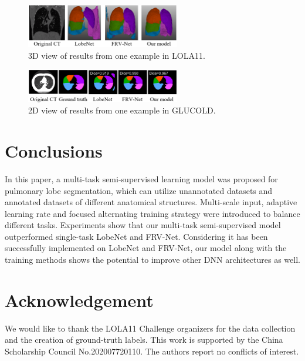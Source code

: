 \begin{figure}[tb]
    \centering
    \includegraphics[width=0.6\textwidth]{3d_compare.png}
    \caption{3D view of results from one example in LOLA11.}
    \label{fig:chap2_3d}
\end{figure}

\begin{figure}[tb]
    \centering
    \includegraphics[width=0.6\textwidth]{2d_compare.png}
    \caption{2D view of results from one example in GLUCOLD.}
    \label{fig:chap2_2d}
\end{figure}



\section{Conclusions}
In this paper, a multi-task semi-supervised learning model was proposed for pulmonary lobe segmentation, which can utilize unannotated datasets and annotated datasets of different anatomical structures. Multi-scale input, adaptive learning rate and focused alternating training strategy were introduced to balance different tasks. Experiments show that our multi-task semi-supervised model outperformed single-task LobeNet and FRV-Net. Considering it has been successfully implemented on LobeNet and FRV-Net, our model along with the training methods shows the potential to improve other DNN architectures as well. 


\section*{Acknowledgement}
We would like to thank the LOLA11 Challenge organizers for the data collection and the creation of ground-truth labels. This work is supported by the China Scholarship Council No.202007720110. The authors report no conflicts of interest.

